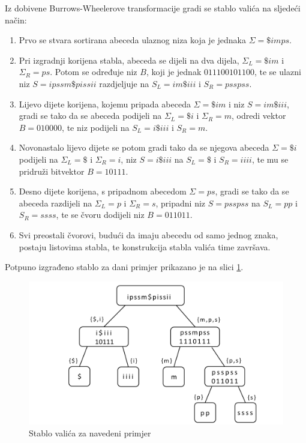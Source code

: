 \documentclass[a4paper,12pt]{article}
\begin{document}
Iz dobivene Burrows-Wheelerove transformacije gradi se stablo valića na sljedeći način:
\begin{enumerate}
	\item Prvo se stvara sortirana abeceda ulaznog niza koja je jednaka $\Sigma=\$imps$.

	\item Pri izgradnji korijena stabla, abeceda se dijeli na dva dijela, $\Sigma_L = \$im$ i $\Sigma_R = ps$. Potom se određuje niz $B$, koji je jednak $011100101100$, te se ulazni niz $S = ipssm\$pissii$ razdjeljuje na $S_L = im\$iii$ i $S_R = psspss$.
	
	\item Lijevo dijete korijena, kojemu pripada abeceda $\Sigma = \$im$ i niz $S = im\$iii$, gradi se tako da se abeceda podijeli na $\Sigma_L = \$i$ i $\Sigma_R = m$, odredi vektor $B = 010000$, te niz podijeli na $S_L = i\$iii$ i $S_R = m$.
	
	\item Novonastalo lijevo dijete se potom gradi tako da se njegova abeceda $\Sigma = \$i$ podijeli na $\Sigma_L = \$$ i $\Sigma_R = i$, niz $S = i\$iii$ na $S_L = \$$ i $S_R = iiii$, te mu se pridruži bitvektor $B = 10111$.
	
	\item Desno dijete korijena, s pripadnom abecedom $\Sigma = ps$, gradi se tako da se abeceda razdijeli na $\Sigma_L = p$ i $\Sigma_R = s$, pripadni niz $S = psspss$ na $S_L = pp$ i $S_R = ssss$, te se čvoru dodijeli niz $B = 011011$.
	
	\item Svi preostali čvorovi, budući da imaju abecedu od samo jednog znaka, postaju listovima stabla, te konstrukcija stabla valića time završava.

\end{enumerate}
	
Potpuno izgrađeno stablo za dani primjer prikazano je na slici \ref{fig:waveletTree}.

	\begin{figure}[h!]
		\begin{center}
			\includegraphics[width=\columnwidth]{waveletTree.png}
			\caption{Stablo valića za navedeni primjer}
			\label{fig:waveletTree}
		\end{center}
	\end{figure}
\end{document}

